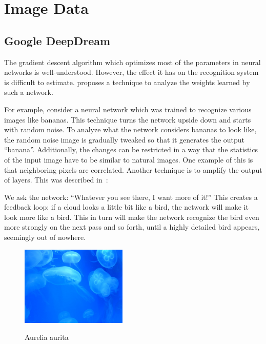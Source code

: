 
\section{Image Data}\label{sec:images}%

\subsection{Google DeepDream}\label{subsec:google-deepdream}%
The gradient descent algorithm which optimizes most of the parameters in neural
networks is well-understood. However, the effect it has on the recognition
system is difficult to estimate. \cite{inceptionism2015} proposes a technique
to analyze the weights learned by such a network.

For example, consider a neural network which was trained to recognize various
images like bananas. This technique turns the network upside down and starts
with random noise. To analyze what the network considers bananas to look like,
the random noise image is gradually tweaked so that it generates the output
\enquote{banana}. Additionally, the changes can be restricted in a way that the
statistics of the input image have to be similar to natural images. One example
of this is that neighboring pixels are correlated.
\goodbreak
Another technique is to amplify the output of layers. This was described
in~\cite{inceptionism2015}:\nobreak%
\begin{displayquote}
We ask the network: \enquote{Whatever you see there, I want more of it!} This
creates a feedback loop: if a cloud looks a little bit like a bird, the network
will make it look more like a bird. This in turn will make the network
recognize the bird even more strongly on the next pass and so forth, until a
highly detailed bird appears, seemingly out of nowhere.
\end{displayquote}

\begin{figure}[ht]
    \centering
    \includegraphics[width=0.45\textwidth]{figures/DeepDream/Aurelia-aurita-3/Aurelia-aurita-3.jpg}
        \label{fig:Aurelia-aurita-3-original}
    \caption{Aurelia aurita}
\end{figure}


